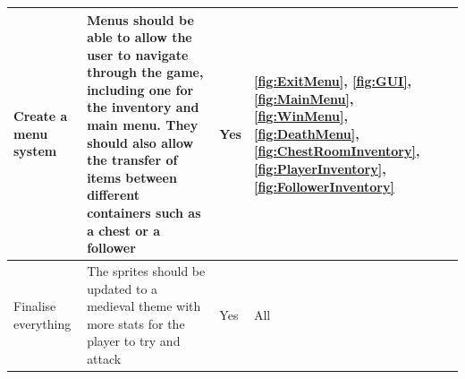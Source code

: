 \documentclass[../Main.tex]{subfiles}
\begin{document}
\begin{center}
\begin{tabular}{ | m{} | m{} | m{} | m{} | }
                    \hline
                    Create a menu system & Menus should be able to allow the user to navigate through the game, including one for the inventory and main menu. They should also allow the transfer of items between different containers such as a chest or a follower & Yes & \ref{fig:ExitMenu}, \ref{fig:GUI}, \ref{fig:MainMenu}, \ref{fig:WinMenu}, \ref{fig:DeathMenu}, \ref{fig:ChestRoomInventory}, \ref{fig:PlayerInventory}, \ref{fig:FollowerInventory} \\
                    \hline
                    Finalise everything & The sprites should be updated to a medieval theme with more stats for the player to try and attack & Yes & All \\
                    \hline
                \end{tabular}
            \end{center}
\end{document}
